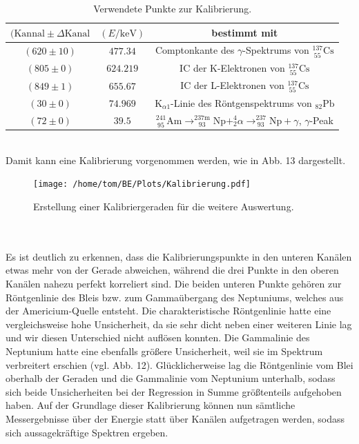 \documentclass[german,  %
parskip=full,  %
]{scrartcl}
\begin{document}
\begin{table}[h!]\centering
\begin{tabular}{|c|c|c|}
\hline
\((\mathrm{Kannal}\pm\Delta\mathrm{Kanal}\) & \((E/\mathrm{keV})\)& bestimmt mit \\\hline
\((620\pm 10)\) & \(477.34\) & Comptonkante des \(\gamma\)-Spektrums von \(^{137}_{\ 55}\mathrm{Cs}\) \\\hline
\((805\pm 0)\) & \(624.219\) & IC der K-Elektronen von \(^{137}_{\ 55}\mathrm{Cs}\) \\\hline
\((849\pm 1)\) & \(655.67\) & IC der L-Elektronen von \(^{137}_{\ 55}\mathrm{Cs}\) \\\hline
\((30\pm 0)\) & \(74.969\) & \(\mathrm{K}_{\alpha1}\)-Linie des Röntgenspektrums von \(_{82}\mathrm{Pb}\) \\\hline
\((72\pm 0)\) & \(39.5\) & \(^{241}_{\ 95}\mathrm{Am}\rightarrow ^{237\mathrm{m}}_{\ \ \ 93}\mathrm{Np} + ^4_2\alpha\rightarrow ^{237}_{\ 93}\mathrm{Np} + \gamma\), \(\gamma\)-Peak \\\hline
\end{tabular}
\caption{Verwendete Punkte zur Kalibrierung.}
\end{table} \\
\newpage
Damit kann eine Kalibrierung vorgenommen werden, wie in Abb. 13 dargestellt. \\
\begin{figure}[h!]\centering
\texttt{[image: /home/tom/BE/Plots/Kalibrierung.pdf]}
\caption{Erstellung einer Kalibriergeraden für die weitere Auswertung.}
\end{figure} \\\\
Es ist deutlich zu erkennen, dass die Kalibrierungspunkte in den unteren Kanälen etwas mehr von der Gerade abweichen, während die drei Punkte in den oberen Kanälen nahezu perfekt korreliert sind. Die beiden unteren Punkte gehören zur Röntgenlinie des Bleis bzw. zum Gammaübergang des Neptuniums, welches aus der Americium-Quelle entsteht. Die charakteristische Röntgenlinie hatte eine vergleichsweise hohe Unsicherheit, da sie sehr dicht neben einer weiteren Linie lag und wir diesen Unterschied nicht auflösen konnten. Die Gammalinie des Neptunium hatte eine ebenfalls größere Unsicherheit, weil sie im Spektrum verbreitert erschien (vgl. Abb. 12). Glücklicherweise lag die Röntgenlinie vom Blei oberhalb der Geraden und die Gammalinie vom Neptunium unterhalb, sodass sich beide Unsicherheiten bei der Regression in Summe größtenteils aufgehoben haben. Auf der Grundlage dieser Kalibrierung können nun sämtliche Messergebnisse über der Energie statt über Kanälen aufgetragen werden, sodass sich aussagekräftige Spektren ergeben.
\end{document}

